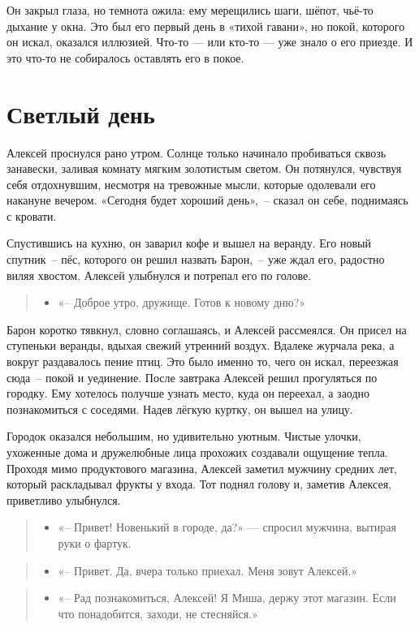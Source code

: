 \documentclass[12pt,a4paper]{book}
\newenvironment{dialogue}{\begin{quote}\itshape\begin{itemize}\item[]}{\end{itemize}\end{quote}}
\begin{document}
Он закрыл глаза, но темнота ожила: ему мерещились шаги, шёпот, чьё-то дыхание у окна. Это был его первый день в «тихой гавани», но покой, которого он искал, оказался иллюзией. Что-то — или кто-то — уже знало о его приезде. И это что-то не собиралось оставлять его в покое.

\chapter{Светлый день}

Алексей проснулся рано утром. Солнце только начинало пробиваться сквозь занавески, заливая комнату мягким золотистым светом. Он потянулся, чувствуя себя отдохнувшим, несмотря на тревожные мысли, которые одолевали его накануне вечером. «Сегодня будет хороший день»,~-- сказал он себе, поднимаясь с кровати.

Спустившись на кухню, он заварил кофе и вышел на веранду. Его новый спутник~-- пёс, которого он решил назвать Барон,~-- уже ждал его, радостно виляя хвостом. Алексей улыбнулся и потрепал его по голове.

\begin{dialogue}
«-- Доброе утро, дружище. Готов к новому дню?»
\end{dialogue}

Барон коротко тявкнул, словно соглашаясь, и Алексей рассмеялся. Он присел на ступеньки веранды, вдыхая свежий утренний воздух. Вдалеке журчала река, а вокруг раздавалось пение птиц. Это было именно то, чего он искал, переезжая сюда~-- покой и уединение.
После завтрака Алексей решил прогуляться по городку. Ему хотелось получше узнать место, куда он переехал, а заодно познакомиться с соседями. Надев лёгкую куртку, он вышел на улицу.

Городок оказался небольшим, но удивительно уютным. Чистые улочки, ухоженные дома и дружелюбные лица прохожих создавали ощущение тепла. Проходя мимо продуктового магазина, Алексей заметил мужчину средних лет, который раскладывал фрукты у входа. Тот поднял голову и, заметив Алексея, приветливо улыбнулся.

\begin{dialogue}
«-- Привет! Новенький в городе, да?» — спросил мужчина, вытирая руки о фартук.
\end{dialogue}

\begin{dialogue}
«-- Привет. Да, вчера только приехал. Меня зовут Алексей.»
\end{dialogue}

\begin{dialogue}
«-- Рад познакомиться, Алексей! Я Миша, держу этот магазин. Если что понадобится, заходи, не стесняйся.»
\end{dialogue}
\end{document}
